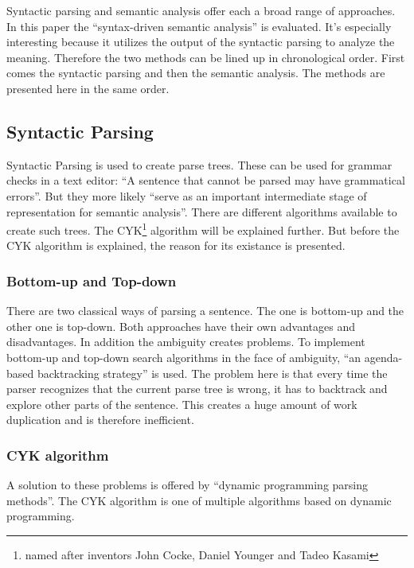 \documentclass[12pt,twoside]{scrartcl}
\theoremstyle{plain}
\theoremstyle{definition}
\theoremstyle{remark}
\begin{document}
	Syntactic parsing and semantic analysis offer each a broad range of approaches. In this paper the ``syntax-driven semantic analysis''\cite[p.~617]{Jurafsky2009} is evaluated. It's especially interesting because it utilizes the output of the syntactic parsing to analyze the meaning. Therefore the two methods can be lined up in chronological order. First comes the syntactic parsing and then the semantic analysis. The methods are presented here in the same order. 
	
	\subsection{Syntactic Parsing}
	\label{subSec:syntacticParsing}
		Syntactic Parsing is used to create parse trees. These can be used for grammar checks in a text editor: ``A sentence that cannot be parsed may have grammatical errors''\cite[p.~461]{Jurafsky2009b}. But they more likely ``serve as an important intermediate stage of representation for semantic analysis''\cite[p.~461]{Jurafsky2009b}. There are different algorithms available to create such trees. The CYK\footnote{named after inventors John Cocke, Daniel Younger and Tadeo Kasami} algorithm will be explained further. But before the CYK algorithm is explained, the reason for its existance is presented.
		
		\subsubsection*{Bottom-up and Top-down}
		\label{subSubSec:bottomUpTopDown}
		
		There are two classical ways of parsing a sentence. The one is bottom-up and the other one is top-down. Both approaches have their own advantages and disadvantages. In addition the ambiguity creates problems. To implement bottom-up and top-down search algorithms in the face of ambiguity, ``an agenda-based backtracking strategy''\cite[p.~468]{Jurafsky2009b} is used. The problem here is that every time the parser recognizes that the current parse tree is wrong, it has to backtrack and explore other parts of the sentence. This creates a huge amount of work duplication and is therefore inefficient.
		
		\subsubsection*{CYK algorithm}
		\label{subSubSec:cykAlgorithm}		
		
		A solution to these problems is offered by ``dynamic programming parsing methods''\cite[p.~469]{Jurafsky2009b}. The CYK algorithm is one of multiple algorithms based on dynamic programming.
		
\end{document}
